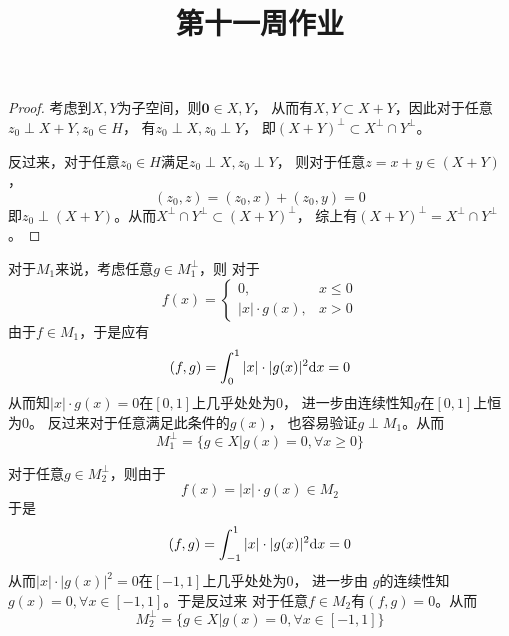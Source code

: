 \documentclass[cn]{homework}
\title{第十一周作业}
\begin{document}
    \maketitle

    \problem

    \problem
    \begin{proof}
        考虑到$X,Y$为子空间，则$\boldsymbol 0\in X,Y$，
        从而有$X,Y\subset X+Y$，因此对于任意$z_0\perp X+Y,z_0\in H$，
        有$z_0\perp X,z_0\perp Y$，
        即$(X+Y)^\perp\subset X^\perp\cap Y^\perp$。

        反过来，对于任意$z_0\in H$满足$z_0\perp X,z_0\perp Y$，
        则对于任意$z=x+y\in (X+Y)$，
        \[(z_0,z)=(z_0,x)+(z_0,y)=0\]
        即$z_0\perp (X+Y)$。从而$X^\perp\cap Y^\perp\subset (X+Y)^\perp$，
        综上有$(X+Y)^\perp=X^\perp\cap Y^\perp$。
    \end{proof}

    \problem

    \problem
    \newcommand{\cg}{\overline}
    对于$M_1$来说，考虑任意$g\in M_1^\perp$，则
    对于
    \[f(x)=\begin{cases}
        0,&x\leq 0\\
        |x|\cdot g(x),&x>0
    \end{cases}\]
    由于$f\in M_1$，于是应有
    \[(f,g)=\int_0^1|x|\cdot|g(x)|^2\mathrm d x=0\]
    从而知$|x|\cdot g(x)=0$在$[0,1]$上几乎处处为$0$，
    进一步由连续性知$g$在$[0,1]$上恒为$0$。
    反过来对于任意满足此条件的$g(x)$，
    也容易验证$g\perp M_1$。从而
    \[M_1^\perp=\{g\in X|g(x)=0,\forall x\geq 0\}\]

    对于任意$g\in M_2^\perp$，则由于
    \[f(x)=|x|\cdot g(x)\in M_2\]
    于是
    \[(f,g)=\int_{-1}^1|x|\cdot|g(x)|^2\mathrm d x=0\]
    从而$|x|\cdot |g(x)|^2=0$在$[-1,1]$上几乎处处为$0$，
    进一步由
    $g$的连续性知$g(x)=0,\forall x\in[-1,1]$。于是反过来
    对于任意$f\in M_2$有$(f,g)=0$。从而
    \[M_2^\perp=\{g\in X|g(x)=0,\forall x\in[-1,1]\}\]
\end{document}
